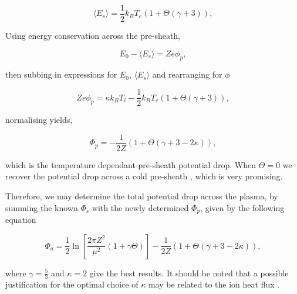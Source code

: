 \documentclass{article}
\begin{document}
\begin{equation}\label{eq:AverageEnergy2}
\langle E_{s} \rangle = \frac{1}{2}k_B T_e \left(1 + \Theta\left(\gamma + 3\right)\right),
\end{equation}

\smallskip 

Using energy conservation across the pre-sheath,

\begin{equation}\label{eq:EnergyConservation2}
E_0 - \langle E_{s} \rangle = Ze\phi_p,
\end{equation}

\noindent then subbing in expressions for $E_0$, $\langle E_{s} \rangle$ and rearranging for $\phi$

\begin{equation}\label{eq:PS1}
Ze\phi_p = \kappa k_B T_i - \frac{1}{2}k_B T_e \left(1 + \Theta\left(\gamma + 3\right)\right),
\end{equation}
    
\noindent normalising yields,

\begin{equation}\label{eq:PSpotential}
\Phi_p =  - \frac{1}{2Z}\left(1 + \Theta\left(\gamma + 3 -2\kappa\right)\right),
\end{equation}

\smallskip

\noindent which is the temperature dependant pre-sheath potential drop.
When $\Theta = 0$ we recover the potential drop across a cold pre-sheath \cite{Stangeby1986}, 
which is very promising.

\smallskip

Therefore, we may determine the total potential drop across the plasma, by summing the known
$\Phi_s$ with the newly determined $\Phi_p$, given by the following equation

\begin{equation}\label{eq:FSpotential}
\Phi_a =  \frac{1}{2}\ln{\left[\frac{2\pi Z^2}{\mu^2}(1 + \gamma \Theta)\right]} - \frac{1}{2Z}\left(1 + \Theta\left(\gamma + 3 -2\kappa\right)\right),
\end{equation}

\medskip 

\noindent where $\gamma = \frac{5}{3}$ and $\kappa = 2$ give the best results. It should be noted 
that a possible justification for the optimal choice of $\kappa$ 
may be related to the ion heat flux \cite{Stangeby1986} \cite{Stangeby2000}.

\medskip
\end{document}
